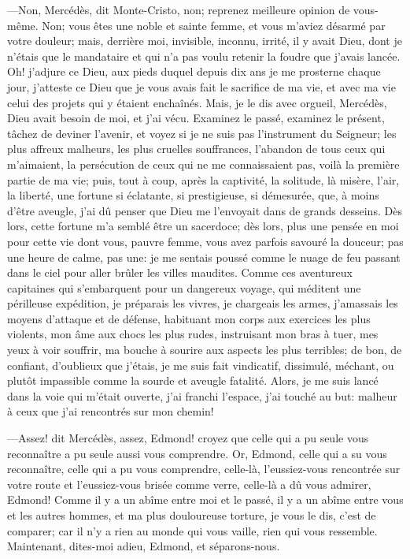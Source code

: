 —Non, Mercédès, dit Monte-Cristo, non; reprenez meilleure opinion de vous-même. Non; vous êtes une noble et sainte femme, et vous m'aviez désarmé par votre douleur; mais, derrière moi, invisible, inconnu, irrité, il y avait Dieu, dont je n'étais que le mandataire et qui n'a pas voulu retenir la foudre que j'avais lancée. Oh! j'adjure ce Dieu, aux pieds duquel depuis dix ans je me prosterne chaque jour, j'atteste ce Dieu que je vous avais fait le sacrifice de ma vie, et avec ma vie celui des projets qui y étaient enchaînés. Mais, je le dis avec orgueil, Mercédès, Dieu avait besoin de moi, et j'ai vécu. Examinez le passé, examinez le présent, tâchez de deviner l'avenir, et voyez si je ne suis pas l'instrument du Seigneur; les plus affreux malheurs, les plus cruelles souffrances, l'abandon de tous ceux qui m'aimaient, la persécution de ceux qui ne me connaissaient pas, voilà la première partie de ma vie; puis, tout à coup, après la captivité, la solitude, là misère, l'air, la liberté, une fortune si éclatante, si prestigieuse, si démesurée, que, à moins d'être aveugle, j'ai dû penser que Dieu me l'envoyait dans de grands desseins. Dès lors, cette fortune m'a semblé être un sacerdoce; dès lors, plus une pensée en moi pour cette vie dont vous, pauvre femme, vous avez parfois savouré la douceur; pas une heure de calme, pas une: je me sentais poussé comme le nuage de feu passant dans le ciel pour aller brûler les villes maudites. Comme ces aventureux capitaines qui s'embarquent pour un dangereux voyage, qui méditent une périlleuse expédition, je préparais les vivres, je chargeais les armes, j'amassais les moyens d'attaque et de défense, habituant mon corps aux exercices les plus violents, mon âme aux chocs les plus rudes, instruisant mon bras à tuer, mes yeux à voir souffrir, ma bouche à sourire aux aspects les plus terribles; de bon, de confiant, d'oublieux que j'étais, je me suis fait vindicatif, dissimulé, méchant, ou plutôt impassible comme la sourde et aveugle fatalité. Alors, je me suis lancé dans la voie qui m'était ouverte, j'ai franchi l'espace, j'ai touché au but: malheur à ceux que j'ai rencontrés sur mon chemin! 

—Assez! dit Mercédès, assez, Edmond! croyez que celle qui a pu seule vous reconnaître a pu seule aussi vous comprendre. Or, Edmond, celle qui a su vous reconnaître, celle qui a pu vous comprendre, celle-là, l'eussiez-vous rencontrée sur votre route et l'eussiez-vous brisée comme verre, celle-là a dû vous admirer, Edmond! Comme il y a un abîme entre moi et le passé, il y a un abîme entre vous et les autres hommes, et ma plus douloureuse torture, je vous le dis, c'est de comparer; car il n'y a rien au monde qui vous vaille, rien qui vous ressemble. Maintenant, dites-moi adieu, Edmond, et séparons-nous. 

